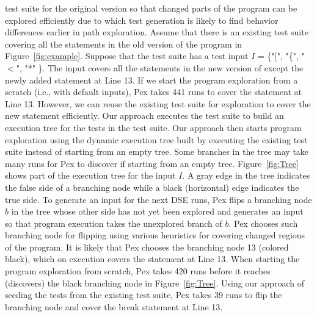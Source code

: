 test suite for the original version so that changed parts of the program can be explored
efficiently due to which test generation is likely to find behavior
differences earlier in path exploration. Assume that there is an existing test suite covering all the statements in the old version of the program in Figure~\ref{fig:example}. Suppose that the test suite has a test input $I$ = \{"[", "\{", "$<$", "*" \}. The input covers all the statements in the new version of  except the newly added  statement at Line 13. If we start the program exploration from a scratch (i.e., with default inputs), Pex takes 441 runs to cover the  statement at Line 13. However, we can reuse the existing test suite for exploration to cover the new statement efficiently. Our approach executes the test suite to build an execution tree for the tests in the test suite. Our approach then starts program exploration using the dynamic execution tree built by executing the existing test suite instead of starting from an empty tree. Some branches in the tree may take many runs for Pex to discover if starting from an empty tree. Figure~\ref{fig:Tree} shows part of the execution tree for the input $I$. A gray edge in the tree indicates the false side of a branching node while a black (horizontal) edge indicates the true side. To generate an input for the next DSE runs, Pex flips a branching node $b$ in the tree whose other side has not yet been explored and generates an input so that program execution takes the unexplored branch of $b$. Pex chooses such branching node for flipping using various heuristics for covering changed regions of the program. It is likely that Pex chooses the branching node 13 (colored black), which on execution covers the  statement at Line 13. When starting the program exploration from scratch, Pex takes 420 runs before it reaches (discovers) the black branching node in Figure~\ref{fig:Tree}. Using our approach of seeding the tests from the existing test suite, Pex takes 39 runs to flip the branching node and cover the break statement at Line 13.






